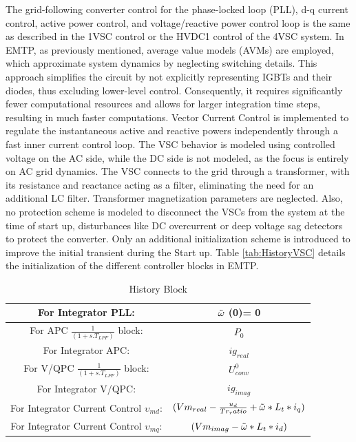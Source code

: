 \documentclass{report}
\begin{document}
The grid-following converter control for the phase-locked loop (PLL), d-q current control, active power control, and voltage/reactive power control loop is the same as described in the 1VSC control or the HVDC1 control of the 4VSC system. In EMTP, as previously mentioned, average value models (AVMs) are employed, which approximate system dynamics by neglecting switching details. 
This approach simplifies the circuit by not explicitly representing IGBTs and their diodes, thus excluding lower-level control. Consequently, it requires significantly fewer computational resources and allows for larger integration time steps, resulting in much faster computations. Vector Current Control is implemented to regulate the instantaneous active and reactive powers independently through a fast inner current control loop. The VSC behavior is modeled using controlled voltage on the AC side, while the DC side is not modeled, as the focus is entirely on AC grid dynamics. The VSC connects to the grid through a transformer, with its resistance and reactance acting as a filter, eliminating the need for an additional LC filter. Transformer magnetization parameters are neglected. Also, no protection scheme is modeled to disconnect the VSCs from the system at the time of start up, disturbances like DC overcurrent or deep voltage sag detectors to protect the converter. Only an additional initialization scheme is introduced to improve the initial transient during the Start up.  Table \ref{tab:HistoryVSC} details the initialization of the different controller blocks in EMTP.
 \begin{table}[H]
\centering
\caption{History Block}
\begin{tabular}{|c|c|}
    \hline
For Integrator PLL: & ${\Tilde{\omega}}$ (0)= 0 \\
\hline
For APC $\frac{1}{(1+s.T_{LPF})}$ block: & $P_0$\\
\hline
For Integrator APC: &$ig_{real}$ \\
\hline
For V/QPC $\frac{1}{(1+s.T_{LPF})}$ block: & $U_{conv}^0$\\
\hline
For Integrator V/QPC: &$ig_{imag}$ \\
\hline
For Integrator Current Control $\upsilon_{md}$: &$(Vm_{real}- \frac{u_d}{Tr_ratio} + \Tilde{\omega}*L_t*i_q)$ \\
\hline
For Integrator Current Control $\upsilon_{mq}$: &$(Vm_{imag}- \Tilde{\omega}*L_t*i_d)$ \\
    \hline
\end{tabular}
\label{HistoryVSC}
\end{table}
\end{document}
